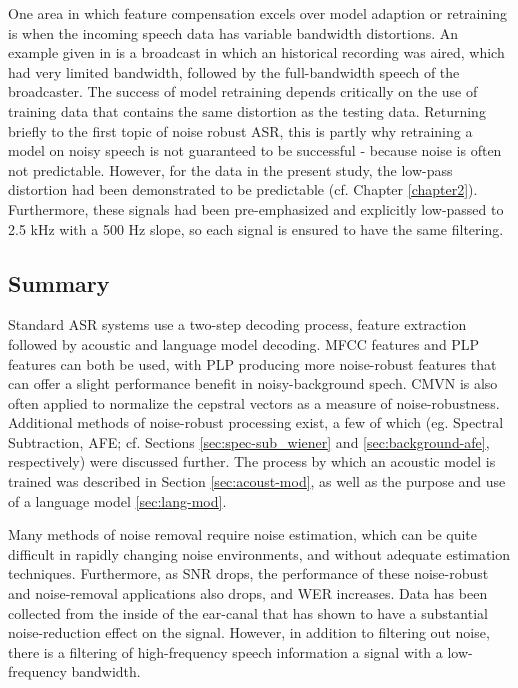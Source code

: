 One area in which feature compensation excels over model adaption or retraining is when the incoming speech data has variable bandwidth distortions.  An example given in \cite{morales:09} is a broadcast in which an historical recording was aired, which had very limited bandwidth, followed by the full-bandwidth speech of the broadcaster.  The success of model retraining depends critically on the use of training data that contains the same distortion as the testing data.  Returning briefly to the first topic of noise robust ASR, this is partly why retraining a model on noisy speech is not guaranteed to be successful - because noise is often not predictable. However, for the data in the present study, the low-pass distortion had been demonstrated to be predictable (cf. Chapter \ref{chapter2}).  Furthermore, these signals had been pre-emphasized and explicitly low-passed to 2.5 kHz with a 500 Hz slope, so each signal is ensured to have the same filtering.  

\subsection{Summary}

Standard ASR systems use a two-step decoding process, feature extraction followed by acoustic and language model decoding.  MFCC features and PLP features can both be used, with PLP producing more noise-robust features that can offer a slight performance benefit in noisy-background spech.  CMVN is also often applied to normalize the cepstral vectors as a measure of noise-robustness.  Additional methods of noise-robust processing exist, a few of which (eg. Spectral Subtraction, AFE; cf. Sections \ref{sec:spec-sub_wiener} and \ref{sec:background-afe}, respectively) were discussed further. The process by which an acoustic model is trained was described in Section \ref{sec:acoust-mod}, as well as the purpose and use of a language model \ref{sec:lang-mod}.

Many methods of noise removal require noise estimation, which can be quite difficult in rapidly changing noise environments, and without adequate estimation techniques. Furthermore, as SNR drops, the performance of these noise-robust and noise-removal applications also drops, and WER increases.  Data has been collected from the inside of the ear-canal that has shown to have a substantial noise-reduction effect on the signal.  However, in addition to filtering out noise, there is a filtering of high-frequency speech information a signal with a low-frequency bandwidth.

